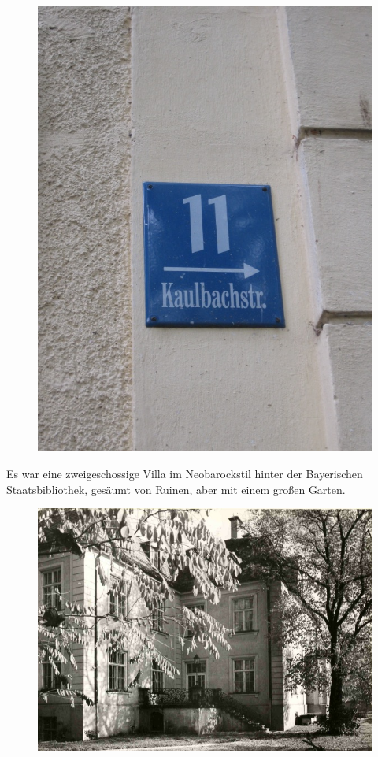 \documentclass[a4paper,
fontsize=11pt,
oneside,
numbers=noperiodatend,
parskip=half-,
bibliography=totoc,
final
]{scrartcl}
\begin{document}
\begin{figure}[htbp]
\centering
\includegraphics{img/bild6.jpg}
\end{figure}

Es war eine zweigeschossige Villa im Neobarockstil hinter der
Bayerischen Staatsbibliothek, gesäumt von Ruinen, aber mit einem großen
Garten.

\begin{figure}[htbp]
\centering
\includegraphics{img/bild7.jpg}
\end{figure}
\end{document}
